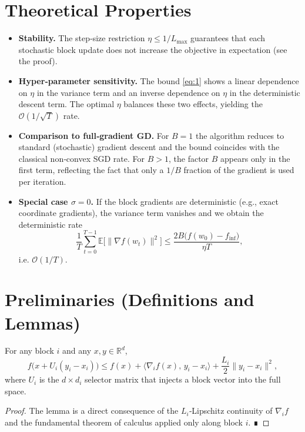 \documentclass{article}
\begin{document}
\section*{Theoretical Properties}
\begin{itemize}
\item \textbf{Stability.} The step‑size restriction $\eta\le1/L_{\max}$ guarantees that each stochastic block update does not increase the objective in expectation (see the proof).

\item \textbf{Hyper‑parameter sensitivity.} The bound \eqref{eq:1} shows a linear dependence on $\eta$ in the variance term and an inverse dependence on $\eta$ in the deterministic descent term. The optimal $\eta$ balances these two effects, yielding the $\mathcal{O}(1/\sqrt{T})$ rate.

\item \textbf{Comparison to full‑gradient GD.} For $B=1$ the algorithm reduces to standard (stochastic) gradient descent and the bound coincides with the classical non‑convex SGD rate. For $B>1$, the factor $B$ appears only in the first term, reflecting the fact that only a $1/B$ fraction of the gradient is used per iteration.

\item \textbf{Special case $ \sigma =0$.} If the block gradients are deterministic (e.g., exact coordinate gradients), the variance term vanishes and we obtain the deterministic rate
\[
\frac{1}{T}\sum_{t=0}^{T-1}\mathbb{E}\!\big[\|\nabla f(w_t)\|^2\big]
\le \frac{2B\big(f(w_0)-f_{\inf}\big)}{\eta T},
\]
i.e. $\mathcal{O}(1/T)$.
\end{itemize}

\section*{Preliminaries (Definitions and Lemmas)}
\begin{lemma}\label{lem:smooth}
For any block $i$ and any $x,y\in\mathbb{R}^d$,
\[
f\big(x+U_i (y_i-x_i)\big)
\le
f(x) + \langle \nabla_i f(x),\, y_i-x_i\rangle
+ \frac{L_i}{2}\|y_i-x_i\|^2,
\]
where $U_i$ is the $d\times d_i$ selector matrix that injects a block vector into the full space.
\end{lemma}
\begin{proof}
The lemma is a direct consequence of the $L_i$‑Lipschitz continuity of $\nabla_i f$ and the fundamental theorem of calculus applied only along block $i$. ∎
\end{proof}
\end{document}
